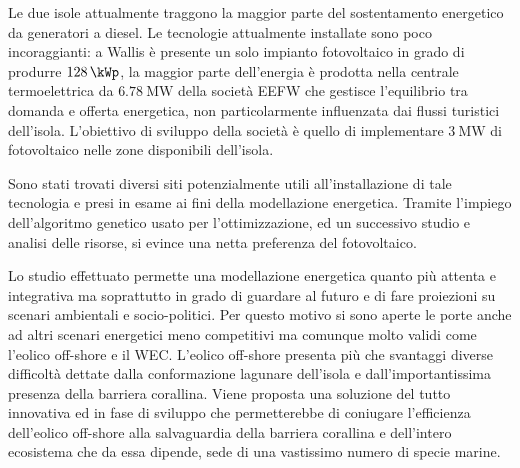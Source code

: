 \documentclass[fleqn,11pt]{SelfArx} %
\begin{document}
Le due isole attualmente traggono la maggior parte del sostentamento energetico da generatori a diesel. Le tecnologie attualmente installate sono poco incoraggianti: a Wallis è presente un solo impianto fotovoltaico in grado di produrre \(\SI{128}{\kWp}\), la maggior parte dell'energia è prodotta nella centrale termoelettrica da \(\SI{6.78}{\MW}\) della società EEFW che gestisce l'equilibrio tra domanda e offerta energetica, non particolarmente influenzata dai flussi turistici dell'isola. L'obiettivo di sviluppo della società  è quello di implementare \(\SI{3}{\MW}\) di fotovoltaico nelle zone disponibili dell'isola. 

Sono stati trovati diversi siti potenzialmente utili all'installazione di tale tecnologia e presi in esame ai fini della modellazione energetica. Tramite l'impiego dell'algoritmo genetico usato per l'ottimizzazione, ed un successivo studio e analisi delle risorse, si evince una netta preferenza del fotovoltaico.

Lo studio effettuato permette una modellazione energetica quanto più attenta e integrativa ma soprattutto in grado di guardare al futuro e di fare proiezioni su scenari ambientali e socio-politici. Per questo motivo si sono aperte le porte anche ad altri scenari energetici meno competitivi ma comunque molto validi come l'eolico off-shore e il WEC. L'eolico off-shore presenta più che svantaggi diverse difficoltà dettate dalla conformazione lagunare dell'isola e dall'importantissima presenza della barriera corallina. Viene proposta una soluzione del tutto innovativa ed in fase di sviluppo che permetterebbe di coniugare l'efficienza dell'eolico off-shore alla salvaguardia della barriera corallina e dell'intero ecosistema che da essa dipende, sede di una vastissimo numero di specie marine. 
\end{document}
